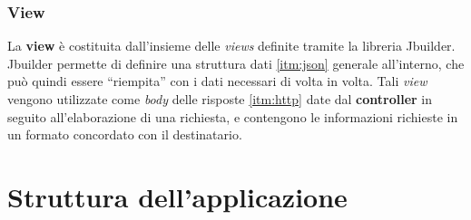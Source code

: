 \subsubsection{View}
La \textbf{view} è costituita dall'insieme delle \textit{views} definite tramite la libreria Jbuilder. Jbuilder permette di definire una struttura dati \ref{itm:json} generale all'interno, che può quindi essere ``riempita'' con i dati necessari di volta in volta. Tali \textit{view} vengono utilizzate come \textit{body} delle risposte \ref{itm:http} date dal \textbf{controller} in seguito all'elaborazione di una richiesta, e contengono le informazioni richieste in un formato concordato con il destinatario.
\section{Struttura dell'applicazione}
